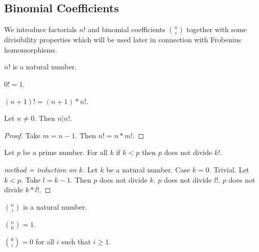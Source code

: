 \documentclass[11pt]{article}
\begin{document}
\subsection{Binomial Coefficients}

\newcommand{\cho}[2]{{#1 \choose #2}}

We introduce factorials $n!$ and binomial coefficients
$\cho{n}{i}$ together with some divisibility properties
which will be used later in connection with
Frobenius homomorphisms.

\newcommand{\fac}[1]{#1 !}

\begin{forthel}

\begin{signature}
$\fac{n}$ is a natural number.
\end{signature}

\begin{axiom}
$\fac{0} = 1$.
\end{axiom}

\begin{axiom}
$\fac{(n+1)} = (n+1) * \fac{n}$.
\end{axiom}

\begin{lemma} Let $n \neq 0$. Then $n | \fac{n}$.
\end{lemma}
\begin{proof}
Take $m = n - 1$.
Then $\fac{n} = n * \fac{m}$.
\end{proof}

\begin{lemma}
Let $p$ be a prime number.
For all $k$ if $k < p$ then $p$ does not divide $\fac{k}$.
\end{lemma}
\begin{proof}[method = induction on $k$]
Let $k$ be a natural number.
Case $k = 0$. Trivial.
Let $k < p$.
Take $l = k - 1$.
Then $p$ does not divide $k$. $p$ does not divide $\fac{l}$.
$p$ does not divide $k * \fac{l}$.
\end{proof}

\begin{signature}
$\cho{n}{i}$ is a natural number.
\end{signature}

\begin{axiom}
$\cho{n}{0} = 1$.
\end{axiom}

\begin{axiom}
$\cho{0}{i} = 0$ for all $i$ such that $i \geq 1$.
\end{axiom}


\end{forthel}
\end{document}
